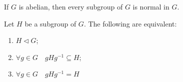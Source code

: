 \begin{eg}
  If $G$ is abelian, then every subgroup of $G$ is normal in $G$.
\end{eg}

\begin{propononum}
  Let $H$ be a subgroup of $G$. The following are equivalent:
  \begin{enumerate}
    \item $H \triangleleft G$;
    \item $\forall g \in G \quad gHg^{-1} \subseteq H$;
    \item $\forall g \in G \quad gHg^{-1} = H$ 
  \end{enumerate}
\end{propononum}



